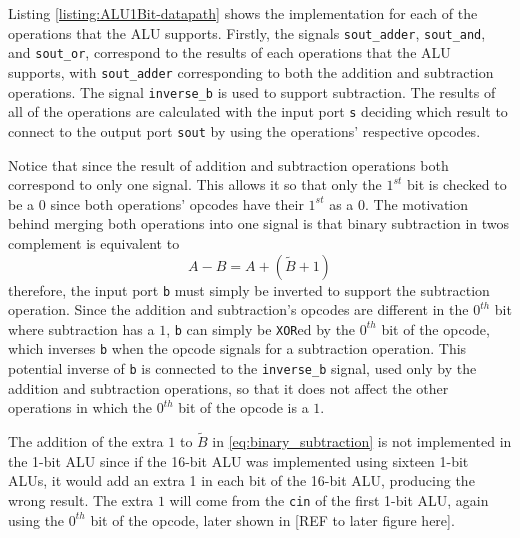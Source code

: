 \documentclass[11pt]{report}
\begin{document}
\newpage


Listing \ref{listing:ALU1Bit-datapath} shows the implementation for each of the operations that the
ALU supports. Firstly, the signals \verb|sout_adder|, \verb|sout_and|, and \verb|sout_or|,
correspond to the results of each operations that the ALU supports, with \verb|sout_adder|
corresponding to both the addition and subtraction operations. The signal \verb|inverse_b| is used
to support subtraction. The results of all of the operations are calculated with the input port
\verb|s| deciding which result to connect to the output port \verb|sout| by using the operations'
respective opcodes.

Notice that since the result of addition and subtraction operations both correspond to only one
signal. This allows it so that only the $1^{st}$ bit is checked to be a $0$ since both operations'
opcodes have their $1^{st}$ as a $0$. The motivation behind merging both operations into one signal
is that binary subtraction in twos complement is equivalent to
\begin{equation} \label{eq:binary_subtraction}
    A - B = A + (\widetilde{B} + 1)
\end{equation}
therefore, the input port \verb|b| must simply be inverted to support the subtraction operation.
Since the addition and subtraction's opcodes are different in the $0^{th}$ bit where subtraction has
a $1$, \verb|b| can simply be \verb|XOR|ed by the $0^{th}$ bit of the opcode, which inverses
\verb|b| when the opcode signals for a subtraction operation. This potential inverse of \verb|b| is
connected to the \verb|inverse_b| signal, used only by the addition and subtraction operations, so
that it does not affect the other operations in which the $0^{th}$ bit of the opcode is a $1$.

The addition of the extra $1$ to $\widetilde{B}$ in \ref{eq:binary_subtraction} is not implemented
in the 1-bit ALU since if the 16-bit ALU was implemented using sixteen 1-bit ALUs, it would add an
extra 1 in each bit of the 16-bit ALU, producing the wrong result. The extra $1$ will come from the
\verb|cin| of the first 1-bit ALU, again using the $0^{th}$ bit of the opcode, later shown in [REF
to later figure here]. 
\end{document}
